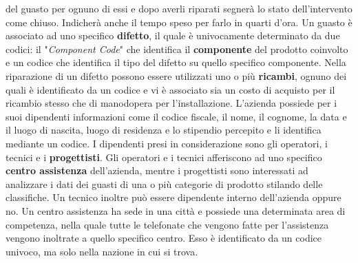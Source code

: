 \documentclass[a4paper, 12pt]{report}
\begin{document}
del guasto per ognuno di essi e dopo averli riparati segnerà lo stato dell'intervento come chiuso. Indicherà anche il tempo speso per farlo in quarti d'ora.\newline
Un guasto è associato ad uno specifico \textbf{difetto}, il quale è univocamente determinato da due codici: il "\textit{Component Code}"
che identifica il \textbf{componente} del prodotto coinvolto e un codice che identifica il tipo del difetto su quello specifico componente. Nella
riparazione di un difetto possono essere utilizzati uno o più \textbf{ricambi}, ognuno dei quali è identificato da un codice e vi è associato
sia un costo di acquisto per il ricambio stesso che di manodopera per l'installazione.\newline
L'azienda possiede per i suoi dipendenti informazioni come il codice fiscale, il nome, il cognome, la data e il luogo di nascita, luogo di
residenza e lo stipendio percepito e li identifica mediante un codice. I dipendenti presi in considerazione sono gli operatori, i tecnici e i
\textbf{progettisti}. Gli operatori e i tecnici afferiscono ad uno specifico \textbf{centro assistenza} dell'azienda,
mentre i progettisti sono interessati ad analizzare i dati dei guasti di una o più categorie di prodotto stilando delle classifiche. Un tecnico
inoltre può essere dipendente interno dell'azienda oppure no.\newline
Un centro assistenza ha sede in una città e possiede una determinata area di competenza, nella quale tutte le telefonate che vengono fatte
per l'assistenza vengono inoltrate a quello specifico centro. Esso è identificato da un codice univoco, ma solo nella nazione in cui si trova.\newline
\end{document}
